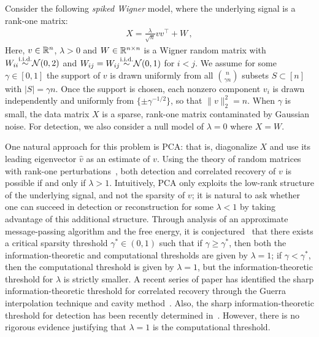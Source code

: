 Consider the following \emph{spiked Wigner} model, where the underlying signal is a rank-one matrix:
\begin{align} \label{eq:sparse_pca_def}
	X = \frac{\lambda}{\sqrt n} vv^\top + W \, ,
\end{align}
Here, $v \in {\mathbb{R}}^n$, $\lambda > 0$ and $W \in {\mathbb{R}}^{n \times n}$ is a Wigner random matrix with $W_{ii} {\stackrel{\text{i.i.d.}}{\sim}} {\mathcal{N}}(0, 2)$ 
and $W_{ij}=W_{ij} {\stackrel{\text{i.i.d.}}{\sim}} {\mathcal{N}}(0, 1)$ for $i<j$.  We assume for some $\gamma \in [0,1]$ the support of $v$ is drawn uniformly from all ${n \choose \gamma n}$ subsets $S \subset [n]$ with $|S| = \gamma n$.  Once the support is chosen, each nonzero component $v_i$ is drawn independently and uniformly from $\{\pm \gamma^{-1/2} \}$, so that 
$\|v\|_2^2 = n$.   When $\gamma$ is small, the data matrix $X$ is a sparse, rank-one matrix contaminated by Gaussian noise. 
For detection, we also consider a null model of $\lambda=0$ where $X=W$. 


One natural approach for this problem is PCA: that is, diagonalize $X$ and use its leading eigenvector $\hat{v}$ as an estimate of $v$. 
Using the theory of random matrices with rank-one perturbations~\cite{baik2005phase,peche2006largest,benaych2011eigenvalues},
both detection and correlated recovery of $v$ is possible if and only if $\lambda > 1$. Intuitively, PCA only exploits the low-rank structure of the underlying signal, and not the sparsity of $v$; it is natural to ask whether one can succeed in detection or reconstruction for some $\lambda < 1$ by taking advantage of this additional structure. 
Through analysis of an approximate message-passing algorithm and the free energy, it is conjectured~\cite{lesieur2015phase,KrzakalaXuZdeborova16} that there exists a critical sparsity threshold $\gamma^\ast \in (0,1)$ such that if $\gamma \ge \gamma^\ast$, then  both the information-theoretic and computational thresholds are given by $\lambda = 1$; if 
$\gamma < \gamma^\ast$, then the computational threshold is given by $\lambda = 1$, but the information-theoretic threshold for $\lambda$ is strictly smaller.  A recent series of paper has identified the sharp information-theoretic threshold for correlated recovery through the Guerra interpolation technique and cavity method~\cite{KrzakalaXuZdeborova16,Barbier16,LelargeMiolane16,alaoui2018estimation}.
Also, the sharp information-theoretic threshold for detection has been recently determined  in~\cite{alaoui2017finite}. 
However, there is no rigorous evidence  
justifying that $\lambda=1$ is the computational threshold. 


